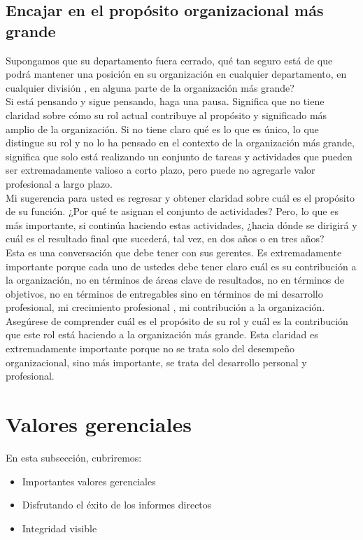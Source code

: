 \documentclass[10pt]{book}
\begin{document}
\subsection{Encajar en el propósito organizacional más grande}
Supongamos que su departamento fuera cerrado, qué tan seguro está de que podrá mantener una posición en su organización en cualquier departamento, en cualquier división , en alguna parte de la organización más grande?\\
Si está pensando y sigue pensando, haga una pausa. Significa que no tiene claridad sobre cómo su rol actual contribuye al propósito y significado más amplio de la organización. Si no tiene claro qué es lo que es único, lo que distingue su rol y no lo ha pensado en el contexto de la organización más grande, significa que solo está realizando un conjunto de tareas y actividades que pueden ser extremadamente valioso a corto plazo, pero puede no agregarle valor profesional a largo plazo.\\
Mi sugerencia para usted es regresar y obtener claridad sobre cuál es el propósito de su función. ¿Por qué te asignan el conjunto de actividades? Pero, lo que es más importante, si continúa haciendo estas actividades, ¿hacia dónde se dirigirá y cuál es el resultado final que sucederá, tal vez, en dos años o en tres años?\\
Esta es una conversación que debe tener con sus gerentes. Es extremadamente importante porque cada uno de ustedes debe tener claro cuál es su contribución a la organización, no en términos de áreas clave de resultados, no en términos de objetivos, no en términos de entregables sino en términos de mi desarrollo profesional, mi crecimiento profesional , mi contribución a la organización.\\
Asegúrese de comprender cuál es el propósito de su rol y cuál es la contribución que este rol está haciendo a la organización más grande. Esta claridad es extremadamente importante porque no se trata solo del desempeño organizacional, sino más importante, se trata del desarrollo personal y profesional.
\section{Valores gerenciales}
En esta subsección, cubriremos:
\begin{itemize}
\item Importantes valores gerenciales
\item Disfrutando el éxito de los informes directos
\item Integridad visible
\end{itemize}
\end{document}

